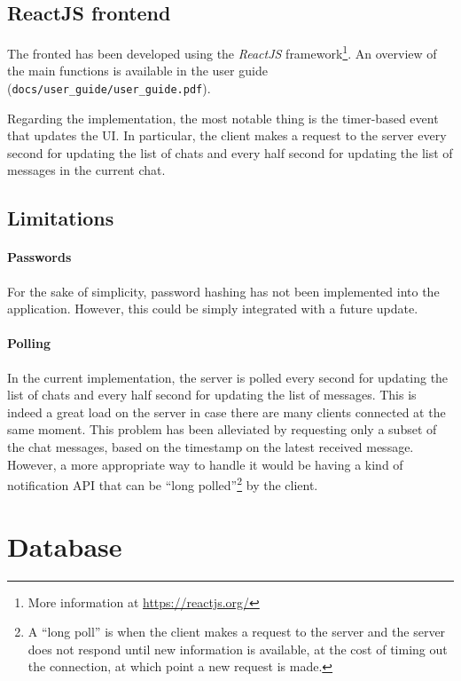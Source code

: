 \documentclass[10pt]{article}
\begin{document}
\subsection{ReactJS frontend}
The fronted has been developed using the \emph{ReactJS} framework\footnote{More
information at \url{https://reactjs.org/}}. An overview of the main functions 
is available in the user guide (\texttt{docs/user\_guide/user\_guide.pdf}).

Regarding the implementation, the most notable thing is the timer-based event
that updates the UI. In particular, the client makes a request to the server
every second for updating the list of chats and every half second for updating 
the list of messages in the current chat.

\subsection{Limitations}
\paragraph{Passwords}
For the sake of simplicity, password hashing has not been implemented into the 
application. However, this could be simply integrated with a future update.

\paragraph{Polling}
In the current implementation, the server is polled every second for updating 
the list of chats and every half second for updating the list of messages. This 
is indeed a great load on the server in case there are many clients connected 
at the same moment. 
This problem has been alleviated by requesting only a subset of the chat 
messages, based on the timestamp on the latest received message.
However, 
a more appropriate way to handle it would be having a kind of notification API
that can be ``long polled''\footnote{A ``long poll'' is when the client 
makes a request to the server and the server does not respond until new 
information is available, at the cost of timing out the connection, at which 
point a new request is made.} by the client.

\section{Database}
\end{document}
